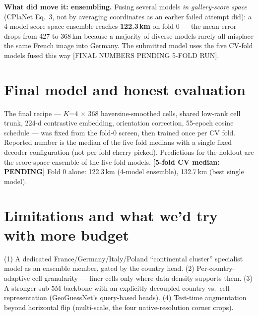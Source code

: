 \documentclass[10pt]{article}
\begin{document}
\textbf{What did move it: ensembling.} Fusing several models \emph{in gallery-score space}
(CPlaNet Eq.~3, not by averaging coordinates as an earlier failed attempt did): a 4-model
score-space ensemble reaches \textbf{122.3\,km} on fold 0 --- the mean error drops from 427
to 368\,km because a majority of diverse models rarely all misplace the same French image
into Germany. The submitted model uses the five CV-fold models fused this way [FINAL NUMBERS
PENDING 5-FOLD RUN].

\section*{Final model and honest evaluation}
The final recipe --- $K$=4 $\times$ 368 haversine-smoothed cells, shared low-rank cell trunk,
224-d contrastive embedding, orientation correction, 55-epoch cosine schedule --- was fixed
from the fold-0 screen, then trained once per CV fold. Reported number is the median of the
five fold medians with a single fixed decoder configuration (not per-fold cherry-picked).
Predictions for the holdout are the score-space ensemble of the five fold models.
\textbf{[5-fold CV median: PENDING]} \quad Fold 0 alone: 122.3\,km (4-model ensemble),
132.7\,km (best single model).

\section*{Limitations and what we'd try with more budget}
(1) A dedicated France/Germany/Italy/Poland ``continental cluster'' specialist model as an
ensemble member, gated by the country head. (2) Per-country-adaptive cell granularity ---
finer cells only where data density supports them. (3) A stronger sub-5M backbone with an
explicitly decoupled country vs.\ cell representation (GeoGuessNet's query-based heads).
(4) Test-time augmentation beyond horizontal flip (multi-scale, the four native-resolution
corner crops).
\end{document}
